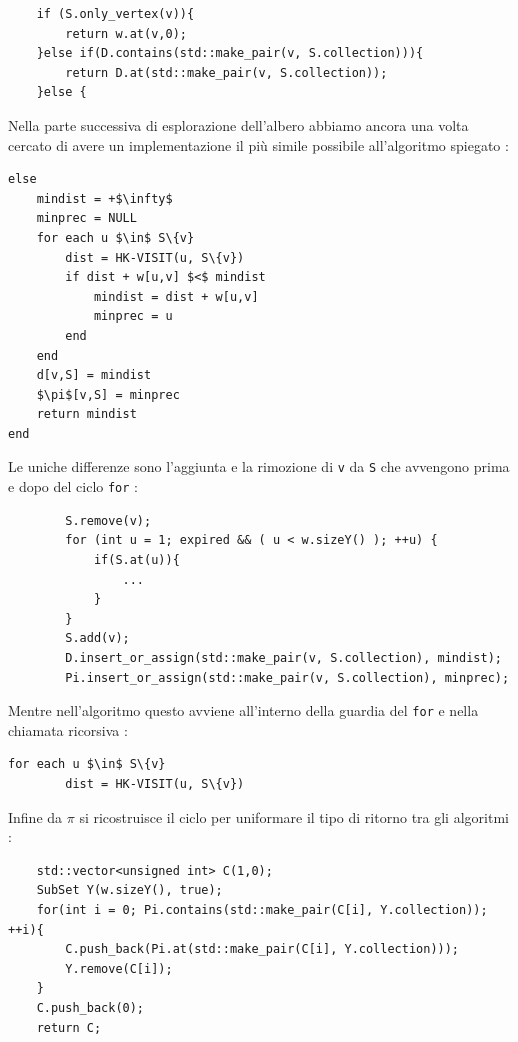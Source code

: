 \documentclass[]{article}
\begin{document}
\begin{flushleft}
\lstset{language=c++, style=mystyle, firstnumber=6}
\begin{lstlisting}
	if (S.only_vertex(v)){
        return w.at(v,0);
    }else if(D.contains(std::make_pair(v, S.collection))){
        return D.at(std::make_pair(v, S.collection));
    }else {
\end{lstlisting}
\medskip
Nella parte successiva di esplorazione dell'albero abbiamo ancora una volta cercato di avere un implementazione il più simile possibile all'algoritmo spiegato :
\begin{lstlisting}[mathescape=true]
else
	mindist = +$\infty$
	minprec = NULL
	for each u $\in$ S\{v}
		dist = HK-VISIT(u, S\{v})
		if dist + w[u,v] $<$ mindist
			mindist = dist + w[u,v]
			minprec = u
		end
	end
	d[v,S] = mindist
	$\pi$[v,S] = minprec
	return mindist
end
\end{lstlisting}
Le uniche differenze sono l'aggiunta e la rimozione di \verb|v| da \verb|S| che avvengono prima e dopo del ciclo \verb|for| :
\lstset{language=c++, style=mystyle, firstnumber=26}
\begin{lstlisting}
        S.remove(v);
        for (int u = 1; expired && ( u < w.sizeY() ); ++u) {
        	if(S.at(u)){
            	...
            }
        }
        S.add(v);
        D.insert_or_assign(std::make_pair(v, S.collection), mindist);
        Pi.insert_or_assign(std::make_pair(v, S.collection), minprec);
\end{lstlisting}
Mentre nell'algoritmo questo avviene all'interno della guardia del \verb|for| e nella chiamata ricorsiva :
\begin{lstlisting}[mathescape=true]
	for each u $\in$ S\{v}
		dist = HK-VISIT(u, S\{v})
\end{lstlisting}
Infine da $\pi$ si ricostruisce il ciclo per uniformare il tipo di ritorno tra gli algoritmi :
\lstset{language=c++, style=mystyle, firstnumber=43}
\begin{lstlisting}
    std::vector<unsigned int> C(1,0);
    SubSet Y(w.sizeY(), true);
    for(int i = 0; Pi.contains(std::make_pair(C[i], Y.collection)); ++i){
        C.push_back(Pi.at(std::make_pair(C[i], Y.collection)));
        Y.remove(C[i]);
    }
    C.push_back(0);
    return C;
\end{lstlisting}




\end{flushleft}
\end{document}
